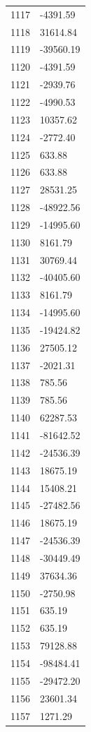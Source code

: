 \documentclass[a4paper,11pt]{article}
\begin{document}
\begin{center}
\begin{longtable}{|R{1.5cm}|R{2.5cm}|}
 1117 &     -4391.59 \\
 1118 &     31614.84 \\
 1119 &    -39560.19 \\
 1120 &     -4391.59 \\
 1121 &     -2939.76 \\
 1122 &     -4990.53 \\
 1123 &     10357.62 \\
 1124 &     -2772.40 \\
 1125 &       633.88 \\
 1126 &       633.88 \\
 1127 &     28531.25 \\
 1128 &    -48922.56 \\
 1129 &    -14995.60 \\
 1130 &      8161.79 \\
 1131 &     30769.44 \\
 1132 &    -40405.60 \\
 1133 &      8161.79 \\
 1134 &    -14995.60 \\
 1135 &    -19424.82 \\
 1136 &     27505.12 \\
 1137 &     -2021.31 \\
 1138 &       785.56 \\
 1139 &       785.56 \\
 1140 &     62287.53 \\
 1141 &    -81642.52 \\
 1142 &    -24536.39 \\
 1143 &     18675.19 \\
 1144 &     15408.21 \\
 1145 &    -27482.56 \\
 1146 &     18675.19 \\
 1147 &    -24536.39 \\
 1148 &    -30449.49 \\
 1149 &     37634.36 \\
 1150 &     -2750.98 \\
 1151 &       635.19 \\
 1152 &       635.19 \\
 1153 &     79128.88 \\
 1154 &    -98484.41 \\
 1155 &    -29472.20 \\
 1156 &     23601.34 \\
 1157 &      1271.29 \\

\end{longtable}
\end{center}
\end{document}
